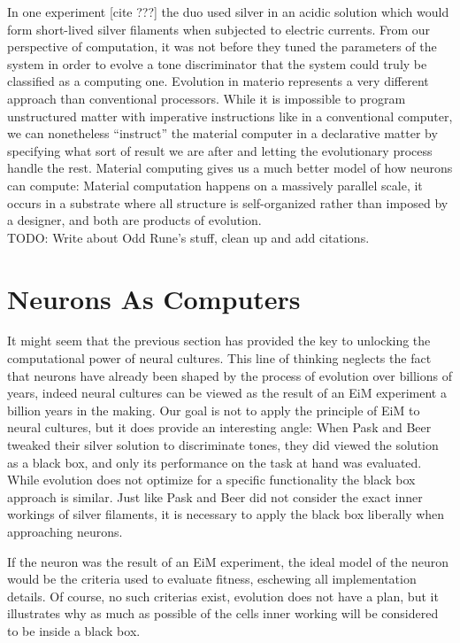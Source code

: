 In one experiment [cite ???] the duo used silver in an acidic solution which would form
short-lived silver filaments when subjected to electric currents.
From our perspective of computation, it was not before they tuned the parameters
of the system in order to evolve a tone discriminator that the system could
truly be classified as a computing one.
Evolution in materio represents a very different approach than conventional
processors.
While it is impossible to program unstructured matter with imperative
instructions like in a conventional computer, we can nonetheless ``instruct''
the material computer in a declarative matter by specifying what sort of result
we are after and letting the evolutionary process handle the rest.
Material computing gives us a much better model of how neurons can compute:
Material computation happens on a massively parallel scale, it occurs in a
substrate where all structure is self-organized rather than imposed by a
designer, and both are products of evolution.\\

TODO: Write about Odd Rune's stuff, clean up and add citations.

\section{Neurons As Computers}
It might seem that the previous section has provided the key to unlocking the
computational power of neural cultures.
This line of thinking neglects the fact that neurons have already been shaped by
the process of evolution over billions of years, indeed neural cultures can be
viewed as the result of an EiM experiment a billion years in the making.
Our goal is not to apply the principle of EiM to neural cultures, but it does
provide an interesting angle:
When Pask and Beer tweaked their silver solution to discriminate tones, they did
viewed the solution as a black box, and only its performance on the task at hand
was evaluated.
While evolution does not optimize for a specific functionality the black box
approach is similar.
Just like Pask and Beer did not consider the exact inner workings of silver
filaments, it is necessary to apply the black box liberally when approaching
neurons.

If the neuron was the result of an EiM experiment, the ideal model of the neuron
would be the criteria used to evaluate fitness, eschewing all implementation
details.
Of course, no such criterias exist, evolution does not have a plan, but it
illustrates why as much as possible of the cells inner working will be
considered to be inside a black box.

